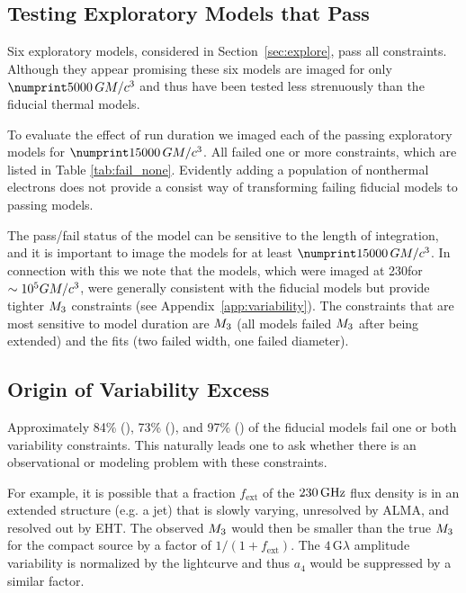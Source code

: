\subsection{Testing Exploratory Models that Pass}

Six exploratory models, considered in Section~\ref{sec:explore},  pass all constraints.
Although they appear promising these six models are imaged for only $\no{5000}\,\tg$ and thus have been tested less strenuously than the fiducial thermal models.

To evaluate the effect of run duration we imaged each of the passing exploratory models for  $\no{15000}\,\tg$.
All failed one or more constraints, which are listed in Table \ref{tab:fail_none}.  
Evidently adding a population of nonthermal electrons does not provide a consist way of transforming failing fiducial models to passing models.  

The pass/fail status of the model can be sensitive to the length of integration, and it is important to image the models for at least $\no{15000}\,\tg$.
In connection with this we note that the \koral models, which were imaged at 230\GHz for $\sim 10^5 GM/c^3$, were generally consistent with the fiducial models but provide tighter $M_{3}$ constraints (see Appendix~\ref{app:variability}).
The constraints that are most sensitive to model duration are $M_{3}$ (all models failed $M_{3}$ after being extended) and the \mring fits (two failed \mring width, one failed \mring diameter).

\subsection{Origin of Variability Excess}

Approximately 84\% (\kharma), 73\% (\bhac), and 97\% (\hamr) of the fiducial models fail one or both variability constraints.
This naturally leads one to ask whether there is an observational or modeling problem with these constraints.

For example, it is possible that a fraction $f_\mathrm{ext}$ of the $230\,\mathrm{GHz}$ flux density is in an extended structure (e.g. a jet) that is slowly varying, unresolved by ALMA, and resolved out by EHT.
The observed $M_{3}$ would then be smaller than the true $M_{3}$ for the compact source by a factor of $1/(1 + f_\mathrm{ext})$.
The $4\,\mathrm{G}\lambda$ amplitude variability is normalized by the lightcurve and thus $a_4$ would be suppressed by a similar factor.

